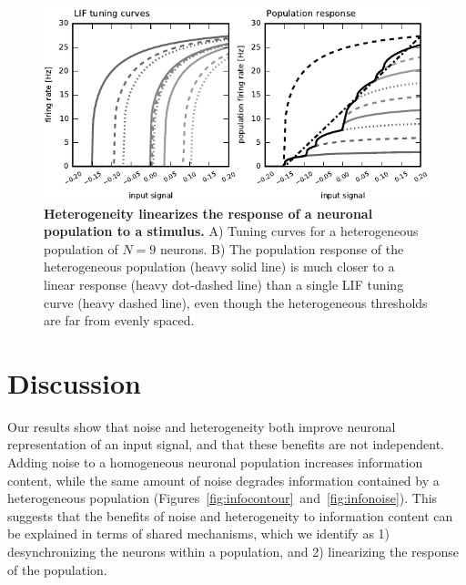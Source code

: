 \documentclass[12pt]{article}
\begin{document}
\begin{figure}
  \ifx\hidefigures\undefined
    \centering
    \includegraphics[width=\textwidth]{figure8_tuninghetero.pdf}
  \fi
  \caption{
    \textbf{Heterogeneity linearizes the response of a neuronal population to a stimulus.} A) Tuning curves for a heterogeneous population of $N = 9$ neurons. B) The population response of the heterogeneous population (heavy solid line) is much closer to a linear response (heavy dot-dashed line) than a single LIF tuning curve (heavy dashed line), even though the heterogeneous thresholds are far from evenly spaced.
  }
  \label{fig:tuninghetero}
\end{figure}


\section{Discussion}
\label{scn:discussion}

Our results show that noise and heterogeneity both improve neuronal representation of an input signal, and that these benefits are not independent. Adding noise to a homogeneous neuronal population increases information content, while the same amount of noise degrades information contained by a heterogeneous population (Figures~\ref{fig:infocontour}~and~\ref{fig:infonoise}). This suggests that the benefits of noise and heterogeneity to information content can be explained in terms of shared mechanisms, which we identify as 1) desynchronizing the neurons within a population, and 2) linearizing the response of the population.
\end{document}
